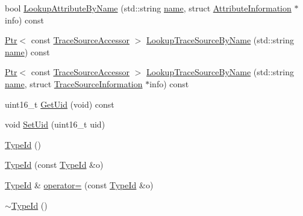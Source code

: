\begin{DoxyCompactItemize}
\item 
bool \hyperlink{classns3_1_1TypeId_ac0a446957d516129937e2f2285aab58b}{Lookup\+Attribute\+By\+Name} (std\+::string \hyperlink{generate__test__data__lte__spectrum__model_8m_ab74e6bf80237ddc4109968cedc58c151}{name}, struct \hyperlink{structns3_1_1TypeId_1_1AttributeInformation}{Attribute\+Information} $\ast$info) const 
\item 
\hyperlink{classns3_1_1Ptr}{Ptr}$<$ const \hyperlink{classns3_1_1TraceSourceAccessor}{Trace\+Source\+Accessor} $>$ \hyperlink{classns3_1_1TypeId_a9b846d40a381142dc29f4dcd9b905c7f}{Lookup\+Trace\+Source\+By\+Name} (std\+::string \hyperlink{generate__test__data__lte__spectrum__model_8m_ab74e6bf80237ddc4109968cedc58c151}{name}) const 
\item 
\hyperlink{classns3_1_1Ptr}{Ptr}$<$ const \hyperlink{classns3_1_1TraceSourceAccessor}{Trace\+Source\+Accessor} $>$ \hyperlink{classns3_1_1TypeId_a8652acf855ab778c2fcf532238ea0fa7}{Lookup\+Trace\+Source\+By\+Name} (std\+::string \hyperlink{generate__test__data__lte__spectrum__model_8m_ab74e6bf80237ddc4109968cedc58c151}{name}, struct \hyperlink{structns3_1_1TypeId_1_1TraceSourceInformation}{Trace\+Source\+Information} $\ast$info) const 
\item 
uint16\+\_\+t \hyperlink{classns3_1_1TypeId_acd3e41de6340d06299f4fd63e2ed8da0}{Get\+Uid} (void) const 
\item 
void \hyperlink{classns3_1_1TypeId_a85ebe2aebd1cbf13dea9d731e3081481}{Set\+Uid} (uint16\+\_\+t uid)
\item 
\hyperlink{classns3_1_1TypeId_ab76e26690f1af4f1cffa6a72245e8928}{Type\+Id} ()
\item 
\hyperlink{classns3_1_1TypeId_a7b4f44ddf93aedaf9c54f556cd47444d}{Type\+Id} (const \hyperlink{classns3_1_1TypeId}{Type\+Id} \&o)
\item 
\hyperlink{classns3_1_1TypeId}{Type\+Id} \& \hyperlink{classns3_1_1TypeId_aa229d821924fa4058b2ea99c3ce56fce}{operator=} (const \hyperlink{classns3_1_1TypeId}{Type\+Id} \&o)
\item 
\hyperlink{classns3_1_1TypeId_aa268fb581d366017aef12170c90e41aa}{$\sim$\+Type\+Id} ()
\end{DoxyCompactItemize}
